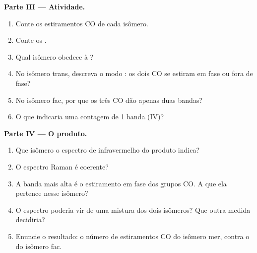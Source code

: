 \begin{problem}
\medskip\noindent\textbf{Parte III --- Atividade.}
\begin{enumerate}[resume]
  \item Conte os estiramentos CO  de cada isômero.
  \item Conte os .
  \item Qual isômero obedece à ?
  \item No isômero trans, descreva o modo : os dois CO se
        estiram em fase ou fora de fase?
  \item No isômero fac, por que os três CO dão apenas duas bandas?
  \item O que indicaria uma contagem de 1 banda (IV)?
\end{enumerate}

\medskip\noindent\textbf{Parte IV --- O produto.}
\begin{enumerate}[resume]
  \item Que isômero o espectro de infravermelho do produto indica?
  \item O espectro Raman é coerente?
  \item A banda mais alta é o estiramento em fase dos grupos CO. A que
         ela pertence nesse isômero?
  \item O espectro poderia vir de uma mistura dos dois isômeros? Que outra
        medida decidiria?
  \item Enuncie o resultado: o número de estiramentos CO  do isômero
        mer, contra o do isômero fac.
\end{enumerate}
\end{problem}
